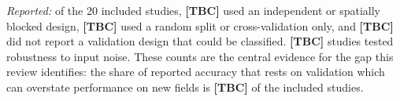 \documentclass[conference]{IEEEtran}
\newcommand{\TBC}{\textbf{[TBC]}}
\begin{document}
\emph{Reported:} of the 20 included studies, \TBC{} used an independent or
spatially blocked design, \TBC{} used a random split or cross-validation only,
and \TBC{} did not report a validation design that could be classified.
\TBC{} studies tested robustness to input noise. These counts are the central
evidence for the gap this review identifies: the share of reported accuracy that
rests on validation which can overstate performance on new fields is \TBC{} of
the included studies.

\end{document}
